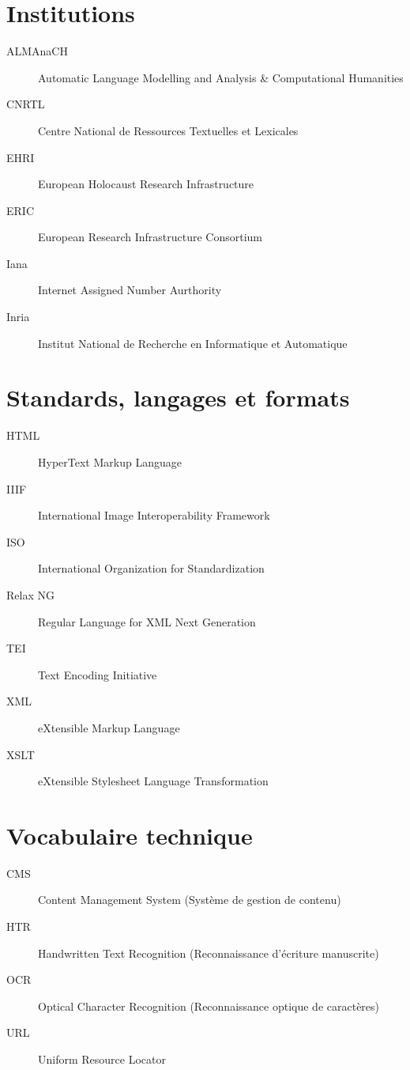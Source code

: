 
\section*{Institutions}
\begin{description}
    \item[ALMAnaCH] Automatic Language Modelling and Analysis \& Computational Humanities
    \item[CNRTL] Centre National de Ressources Textuelles et Lexicales
    \item[EHRI] European Holocaust Research Infrastructure
    \item[ERIC] European Research Infrastructure Consortium
    \item[Iana] Internet Assigned Number Aurthority
    \item[Inria] Institut National de Recherche en Informatique et Automatique
\end{description}

\section*{Standards, langages et formats}
\begin{description}
    \item[HTML] HyperText Markup Language
    \item[IIIF] International Image Interoperability Framework
    \item[ISO] International Organization for Standardization
    \item[Relax NG] Regular Language for XML Next Generation
    \item[TEI] Text Encoding Initiative
    \item[XML] eXtensible Markup Language
    \item[XSLT] eXtensible Stylesheet Language Transformation
\end{description}

\section*{Vocabulaire technique}
\begin{description}
    \item[CMS] Content Management System (Système de gestion de contenu)
    \item[HTR] Handwritten Text Recognition (Reconnaissance d'écriture manuscrite)
    \item[OCR] Optical Character Recognition (Reconnaissance optique de caractères)
    \item[URL] Uniform Resource Locator
\end{description}